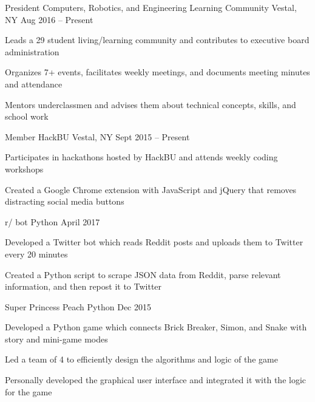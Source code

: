 \documentclass[]{awesome-cv}
\begin{document}
\begin{cventries}
	\cventry
    {President}
	{Computers, Robotics, and Engineering Learning Community}
	{Vestal, NY}
	{Aug 2016 – Present}
	{\begin{cvitems}
		\item {Leads a 29 student living/learning community and contributes to executive board administration}
		\item {Organizes 7+ events, facilitates weekly meetings, and documents meeting minutes and attendance}
        \item {Mentors underclassmen and advises them about technical concepts, skills, and school work}
	\end{cvitems}}
    \cventry
    {Member}
	{HackBU}
	{Vestal, NY}
	{Sept 2015 – Present}
	{\begin{cvitems}
		\item {Participates in hackathons hosted by HackBU and attends weekly coding workshops}
		\item {Created a Google Chrome extension with JavaScript and jQuery that removes distracting social media buttons}
	\end{cvitems}}
\end{cventries}
\vspace{-2mm}

\begin{cventries}
    \cventry
    {}
    {r/ bot}
    {Python}
    {April 2017}
    {\begin{cvitems}
        \vspace{-4mm}
        \item {Developed a Twitter bot which reads Reddit posts and uploads them to Twitter every 20 minutes}
        \item {Created a Python script to scrape JSON data from Reddit, parse relevant information, and then repost it to Twitter}
    \end{cvitems}}
    \vspace{-2mm}

	\cventry
    {}
    {Super Princess Peach}
    {Python}
    {Dec 2015}
    {\begin{cvitems}
        \vspace{-4mm}
		\item {Developed a Python game which connects Brick Breaker, Simon, and Snake with story and mini-game modes}
		\item {Led a team of 4 to efficiently design the algorithms and logic of the game}
        \item {Personally developed the graphical user interface and integrated it with the logic for the game}
    \end{cvitems}}
	\vspace{-2mm}
\end{cventries}
\vspace{-10mm}
\end{document}
